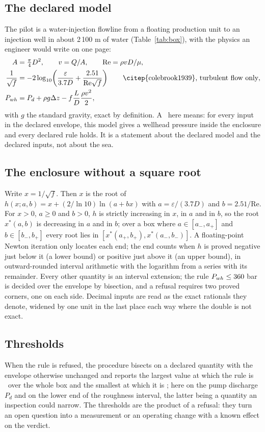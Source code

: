 \documentclass[preprint,11pt,authoryear]{elsarticle}
\begin{document}
\subsection{The declared model}
The pilot is a water-injection flowline from a floating production unit to an injection well in about 2\,100 m of water (Table~\ref{tab:box}), with the physics an engineer would write on one page:
\begin{align}
A &= \tfrac{\pi}{4} D^2, \qquad v = Q/A, \qquad \mathrm{Re} = \rho v D/\mu, \\
\frac{1}{\sqrt f} &= -2\log_{10}\!\left(\frac{\varepsilon}{3.7 D} + \frac{2.51}{\mathrm{Re}\sqrt f}\right) \qquad\text{\citep{colebrook1939}, turbulent flow only}, \\
P_{wh} &= P_d + \rho g \Delta z - f \frac{L}{D}\frac{\rho v^2}{2},
\end{align}
with $g$ the standard gravity, exact by definition. A \vProved\ here means: for every input in the declared envelope, this model gives a wellhead pressure inside the enclosure and every declared rule holds. It is a statement about the declared model and the declared inputs, not about the sea.

\subsection{The enclosure without a square root}
Write $x = 1/\sqrt f$. Then $x$ is the root of $h(x; a, b) = x + (2/\ln 10)\ln(a + b x)$ with $a = \varepsilon/(3.7 D)$ and $b = 2.51/\mathrm{Re}$. For $x > 0$, $a \ge 0$ and $b > 0$, $h$ is strictly increasing in $x$, in $a$ and in $b$, so the root $x^*(a, b)$ is decreasing in $a$ and in $b$; over a box where $a \in [a_-, a_+]$ and $b \in [b_-, b_+]$ every root lies in $[x^*(a_+, b_+), x^*(a_-, b_-)]$. A floating-point Newton iteration only locates each end; the end counts when $h$ is proved negative just below it (a lower bound) or positive just above it (an upper bound), in outward-rounded interval arithmetic with the logarithm from a series with its remainder. Every other quantity is an interval extension; the rule $P_{wh} \le 360$ bar is decided over the envelope by bisection, and a refusal requires two proved corners, one on each side. Decimal inputs are read as the exact rationals they denote, widened by one unit in the last place each way where the double is not exact.

\subsection{Thresholds}
When the rule is refused, the procedure bisects on a declared quantity with the envelope otherwise unchanged and reports the largest value at which the rule is \vProved\ over the whole box and the smallest at which it is \vRefuted; here on the pump discharge $P_d$ and on the lower end of the roughness interval, the latter being a quantity an inspection could narrow. The thresholds are the product of a refusal: they turn an open question into a measurement or an operating change with a known effect on the verdict.
\end{document}
